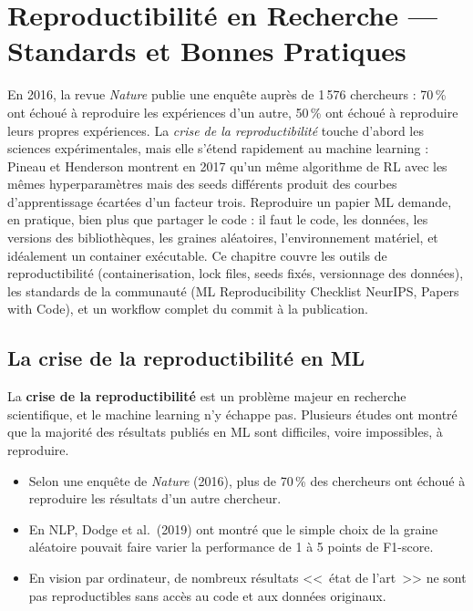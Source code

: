 \chapter{Reproductibilit\'e en Recherche --- Standards et Bonnes Pratiques}
\label{ch:reproductibilite}

En 2016, la revue \emph{Nature} publie une enquête auprès de 1\,576 chercheurs : 70\,\% ont échoué à reproduire les expériences d'un autre, 50\,\% ont échoué à reproduire leurs propres expériences. La \emph{crise de la reproductibilité} touche d'abord les sciences expérimentales, mais elle s'étend rapidement au machine learning : Pineau et Henderson montrent en 2017 qu'un même algorithme de RL avec les mêmes hyperparamètres mais des seeds différents produit des courbes d'apprentissage écartées d'un facteur trois. Reproduire un papier ML demande, en pratique, bien plus que partager le code : il faut le code, les données, les versions des bibliothèques, les graines aléatoires, l'environnement matériel, et idéalement un container exécutable. Ce chapitre couvre les outils de reproductibilité (containerisation, lock files, seeds fixés, versionnage des données), les standards de la communauté (ML Reproducibility Checklist NeurIPS, Papers with Code), et un workflow complet du commit à la publication.

\section{La crise de la reproductibilit\'e en ML}
\label{sec:crise-repro}

La \textbf{crise de la reproductibilit\'e}
est un probl\`eme majeur en recherche scientifique, et le machine learning
n'y \'echappe pas. Plusieurs \'etudes ont montr\'e que la majorit\'e des
r\'esultats publi\'es en ML sont difficiles, voire impossibles, \`a reproduire.

\begin{attention}[title=\textbf{Chiffres alarmants}]
\begin{itemize}
  \item Selon une enqu\^ete de \emph{Nature} (2016), plus de 70\,\% des
    chercheurs ont \'echou\'e \`a reproduire les r\'esultats d'un autre
    chercheur.
  \item En NLP, Dodge et al.\ (2019) ont montr\'e que le simple choix de la
    graine al\'eatoire pouvait faire varier la performance de 1 \`a 5 points
    de F1-score.
  \item En vision par ordinateur, de nombreux r\'esultats <<~\'etat de l'art~>>
    ne sont pas reproductibles sans acc\`es au code et aux donn\'ees originaux.
\end{itemize}
\end{attention}

